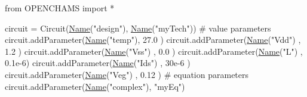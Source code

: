 \begin{DoxyCodeInclude}
\textcolor{keyword}{from} OPENCHAMS \textcolor{keyword}{import} *

circuit = Circuit(\mbox{\hyperlink{class_name}{Name}}(\textcolor{stringliteral}{"design"}), \mbox{\hyperlink{class_name}{Name}}(\textcolor{stringliteral}{"myTech"}))
\textcolor{comment}{# value parameters}
circuit.addParameter(\mbox{\hyperlink{class_name}{Name}}(\textcolor{stringliteral}{"temp"}), 27.0  )
circuit.addParameter(\mbox{\hyperlink{class_name}{Name}}(\textcolor{stringliteral}{"Vdd"}) , 1.2   )
circuit.addParameter(\mbox{\hyperlink{class_name}{Name}}(\textcolor{stringliteral}{"Vss"}) , 0.0   )
circuit.addParameter(\mbox{\hyperlink{class_name}{Name}}(\textcolor{stringliteral}{"L"})   , 0.1e-6)
circuit.addParameter(\mbox{\hyperlink{class_name}{Name}}(\textcolor{stringliteral}{"Ids"}) , 30e-6 )
circuit.addParameter(\mbox{\hyperlink{class_name}{Name}}(\textcolor{stringliteral}{"Veg"}) , 0.12  )
\textcolor{comment}{# equation parameters}
circuit.addParameter(\mbox{\hyperlink{class_name}{Name}}(\textcolor{stringliteral}{"complex"}), \textcolor{stringliteral}{"myEq"})


\end{DoxyCodeInclude}
